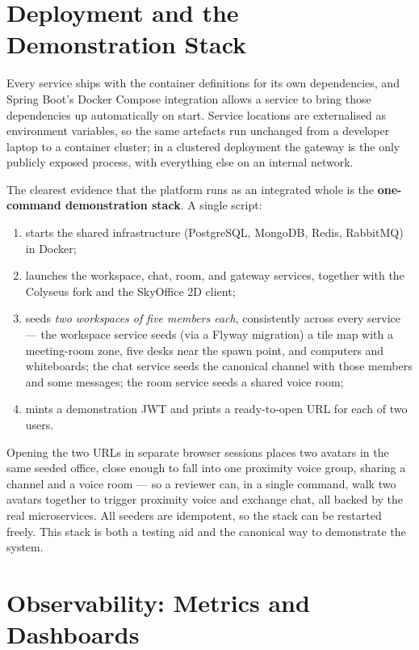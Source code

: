 \section{Deployment and the Demonstration Stack}

Every service ships with the container definitions for its own dependencies, and
Spring Boot's Docker Compose integration allows a service to bring those
dependencies up automatically on start. Service locations are externalised as
environment variables, so the same artefacts run unchanged from a developer laptop
to a container cluster; in a clustered deployment the gateway is the only publicly
exposed process, with everything else on an internal network.

The clearest evidence that the platform runs as an integrated whole is the
\textbf{one-command demonstration stack}. A single script:

\begin{enumerate}
  \item starts the shared infrastructure (PostgreSQL, MongoDB, Redis, RabbitMQ)
  in Docker;
  \item launches the workspace, chat, room, and gateway services, together with
  the Colyseus fork and the SkyOffice 2D client;
  \item seeds \emph{two workspaces of five members each}, consistently across
  every service --- the workspace service seeds (via a Flyway migration) a tile
  map with a meeting-room zone, five desks near the spawn point, and computers and
  whiteboards; the chat service seeds the canonical channel with those members and
  some messages; the room service seeds a shared voice room;
  \item mints a demonstration JWT and prints a ready-to-open URL for each of two
  users.
\end{enumerate}

Opening the two URLs in separate browser sessions places two avatars in the same
seeded office, close enough to fall into one proximity voice group, sharing a
channel and a voice room --- so a reviewer can, in a single command, walk two
avatars together to trigger proximity voice and exchange chat, all backed by the
real microservices. All seeders are idempotent, so the stack can be restarted
freely. This stack is both a testing aid and the canonical way to demonstrate the
system.

\section{Observability: Metrics and Dashboards}
\label{sec:observability}

